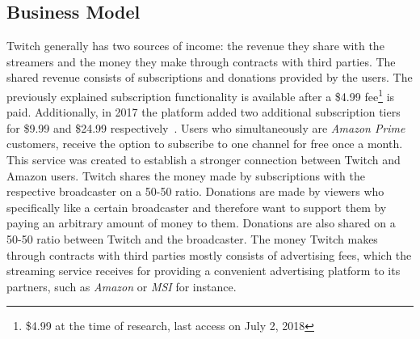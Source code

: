 \subsection{Business Model}
Twitch generally has two sources of income: the revenue they share with the streamers and the money they make through contracts with third parties. 
The shared revenue consists of subscriptions and donations provided by the users. The previously explained subscription functionality is available after a \$4.99 fee\footnote{\$4.99 at the time of research, last access on July 2, 2018} is paid. Additionally, in 2017 the platform added two additional subscription tiers for \$9.99 and \$24.99 respectively~\cite{twitch-subscriptions}. Users who simultaneously are \textit{Amazon Prime} customers, receive  the option to subscribe to one channel for free once a month. This service was created to establish a stronger connection between Twitch and Amazon users. Twitch shares the money made by subscriptions with the respective broadcaster on a 50-50 ratio. Donations are made by viewers who specifically like a certain broadcaster and therefore want to support them by paying an arbitrary amount of money to them. Donations are also shared on a 50-50 ratio between Twitch and the broadcaster. 
The money Twitch makes through contracts with third parties mostly consists of advertising fees, which the streaming service receives for providing a convenient advertising platform to its partners, such as \textit{Amazon} or \textit{MSI} for instance. 

